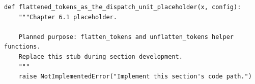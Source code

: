 \begin{lstlisting}[style=bookpython,caption={Planned code placeholder for flattened tokens as the dispatch unit.},label={lst:ch06-flattened-tokens-as-the-dispatch-unit}]
def flattened_tokens_as_the_dispatch_unit_placeholder(x, config):
    """Chapter 6.1 placeholder.

    Planned purpose: flatten_tokens and unflatten_tokens helper functions.
    Replace this stub during section development.
    """
    raise NotImplementedError("Implement this section's code path.")
\end{lstlisting}
